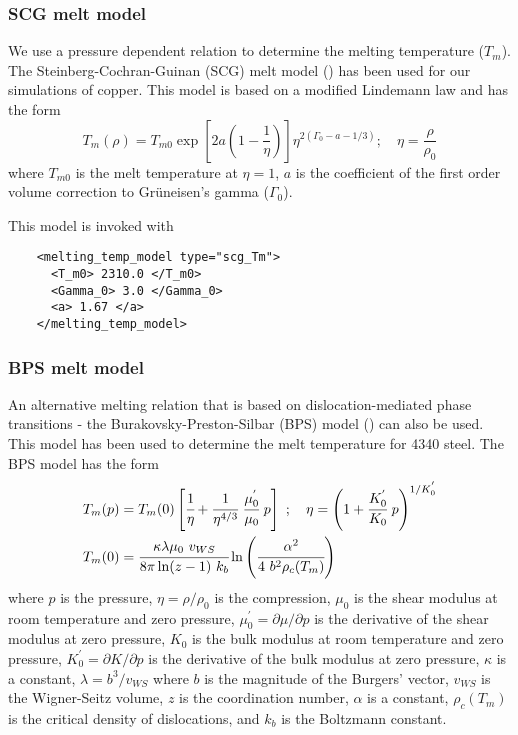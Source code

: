   \subsubsection{SCG melt model}
  We use a pressure dependent relation to determine the melting
  temperature ($T_m$).  The Steinberg-Cochran-Guinan (SCG) melt model
  (\cite{Steinberg80}) has been used for our simulations of copper.
  This model is based on a modified Lindemann law and has the form
  \begin{equation} \label{eq:TmSCG}
    T_m(\rho) = T_{m0} \exp\left[2a\left(1-\frac{1}{\eta}\right)\right]
              \eta^{2(\Gamma_0-a-1/3)}; \quad
    \eta = \frac{\rho}{\rho_0}
  \end{equation}
  where $T_{m0}$ is the melt temperature at $\eta = 1$,
  $a$ is the coefficient of the first order volume correction to
  Gr{\"u}neisen's gamma ($\Gamma_0$).

  This model is invoked with
  \begin{lstlisting}
    <melting_temp_model type="scg_Tm">
      <T_m0> 2310.0 </T_m0>
      <Gamma_0> 3.0 </Gamma_0>
      <a> 1.67 </a>
    </melting_temp_model>
  \end{lstlisting}

  \subsubsection{BPS melt model}
  An alternative melting relation that is based on dislocation-mediated
  phase transitions - the Burakovsky-Preston-Silbar (BPS) model
  (\cite{Burakovsky00}) can also be used.  This model has been used to
  determine the melt temperature for 4340 steel.  The BPS model has the form
  \begin{align}
    T_m(p) & = T_m(0)
      \left[\cfrac{1}{\eta} + 
            \cfrac{1}{\eta^{4/3}}~\cfrac{\mu_0^{'}}{\mu_0}~p\right]~; 
    \quad
    \eta = \left(1 + \cfrac{K_0^{'}}{K_0}~p\right)^{1/K_0^{'}} 
    \label{eq:TmBPS}\\
    T_m(0) & = \cfrac{\kappa\lambda\mu_0~v_{WS}}{8\pi\ln(z-1)~k_b}
               \ln\left(\cfrac{\alpha^2}{4~b^2\rho_c(T_m)}\right)
  \end{align}
  where $p$ is the pressure, $\eta = \rho/\rho_0$ is the compression,
  $\mu_0$ is the shear modulus at room temperature and zero pressure,
  $\mu_0^{'} = \partial\mu/\partial p$ is the derivative of the shear modulus
  at zero pressure, $K_0$ is the bulk modulus at room temperature and
  zero pressure, $K_0^{'} = \partial K/\partial p$ is the derivative of the
  bulk modulus at zero pressure, $\kappa$ is a constant, $\lambda = b^3/v_{WS}$
  where $b$ is the magnitude of the Burgers' vector, $v_{WS}$ is the
  Wigner-Seitz volume, $z$ is the coordination number, $\alpha$ is a
  constant, $\rho_c(T_m)$ is the critical density of dislocations, and
  $k_b$ is the Boltzmann constant.

